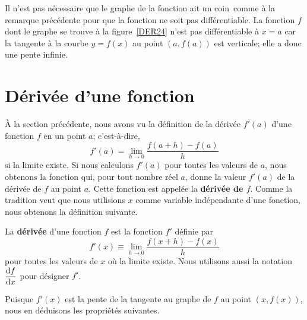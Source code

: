 {

\begin{rmk}
Il n'est pas nécessaire que le graphe de la fonction ait un \lgm
coin\rgm\ comme à la remarque précédente pour que la fonction ne soit
pas différentiable. La fonction $f$ dont le graphe se trouve à la
figure~\ref{DER24} n'est pas différentiable à $x=a$ car la
tangente à la courbe $y=f(x)$ au point $(a,f(a))$ est verticale; elle
a donc une pente infinie.
\end{rmk}


\section{Dérivée d'une fonction} \label{deff_der}

À la section précédente, nous avons vu la définition de la dérivée $f'(a)$
d'une fonction $f$ en un point $a$; c'est-à-dire,
\[
f'(a) = \lim_{h\rightarrow 0} \frac{f(a+h)-f(a)}{h}
\]
si la limite existe.  Si nous calculons $f'(a)$ pour toutes les valeurs de
$a$, nous obtenons la fonction qui, pour tout nombre réel $a$, donne la
valeur $f'(a)$ de la dérivée de $f$ au point $a$.  Cette fonction
est appelée la {\bfseries dérivée de $f$}.  Comme la tradition veut
que nous utilisions $x$ comme variable indépendante d'une fonction, nous
obtenons la définition suivante.

\begin{defn}  
La {\bfseries dérivée} d'une fonction $f$ est la fonction $f'$ définie
par
\[
f'(x) \equiv \lim_{h\rightarrow 0} \frac{f(x+h)-f(x)}{h}
\]
pour toutes les valeurs de $x$ où la limite existe.  Nous utilisons aussi
la notation $\displaystyle \frac{\mathrm{d}f}{\mathrm{d}x}$ pour désigner $f'$.
\end{defn}

Puisque $f'(x)$ est la pente de la tangente au graphe de $f$ au point
$(x,f(x))$, nous en déduisons les propriétés suivantes.

}
